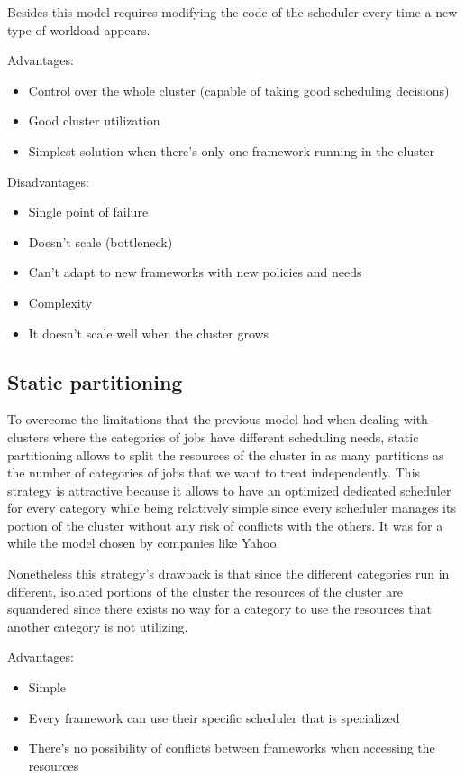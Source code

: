 \documentclass{svjour3}                     %
\begin{document}
Besides this model requires modifying the code of the scheduler every
time a new type of workload appears. 

Advantages:

\begin{itemize}
  \item Control over the whole cluster (capable of taking good scheduling decisions)
  \item Good cluster utilization
  \item Simplest solution when there's only one framework running in the cluster
\end{itemize}

Disadvantages:

\begin{itemize}
  \item Single point of failure
  \item Doesn't scale (bottleneck)
  \item Can't adapt to new frameworks with new policies and needs
  \item Complexity
  \item It doesn't scale well when the cluster grows
\end{itemize}

\subsection{Static partitioning}

To overcome the limitations that the previous model had when dealing
with clusters where the categories of jobs have different scheduling
needs, static partitioning allows to split the resources of the cluster
in as many partitions as the number of categories of jobs that we want to
treat independently. This strategy is attractive because it allows to
have an optimized dedicated scheduler for every category while being
relatively simple since every scheduler manages its portion of the
cluster without any risk of conflicts with the others. It was
for a while the model chosen by companies like Yahoo.

Nonetheless this strategy's drawback is that since the different 
categories run in different, isolated portions of the cluster the
resources of the cluster are squandered since there exists no way for
a category to use the resources that another category is not utilizing.

Advantages:

\begin{itemize}
    \item Simple
    \item Every framework can use their specific scheduler that is specialized
    \item There's no possibility of conflicts between frameworks when
      accessing the resources
\end{itemize}
\end{document}
